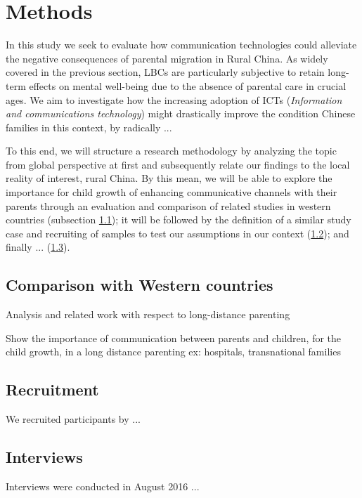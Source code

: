 \section{Methods}
\label{methods}


In this study we seek to evaluate how communication technologies could alleviate the negative consequences of parental migration in Rural China. As widely covered in the previous section, LBCs are particularly subjective to retain long-term effects on mental well-being due to the absence of parental care in crucial ages. We aim to investigate how the increasing adoption of ICTs (\textit{Information and communications technology}) might drastically improve the condition Chinese families in this context, by radically ...

To this end, we will structure a research methodology by analyzing the topic from global perspective at first and subsequently relate our findings to the local reality of interest, rural China. By this mean, we will be able to explore the importance for child growth of enhancing communicative channels with their parents through an evaluation and comparison of related studies in western countries (subsection \ref{methods-compare}); it will be followed by the definition of a similar study case and recruiting of samples to test our assumptions in our context (\ref{methods-recruitment}); and finally ... (\ref{methods-interviews}).

\subsection{Comparison with Western countries}
\label{methods-compare}
Analysis and related work with respect to long-distance parenting 

Show the importance of communication between parents and children, for the child growth, in a long distance parenting 
ex: hospitals, transnational families

\subsection{Recruitment}
\label{methods-recruitment}
We recruited participants by ...

\subsection{Interviews}
\label{methods-interviews}
Interviews were conducted in August 2016 ...